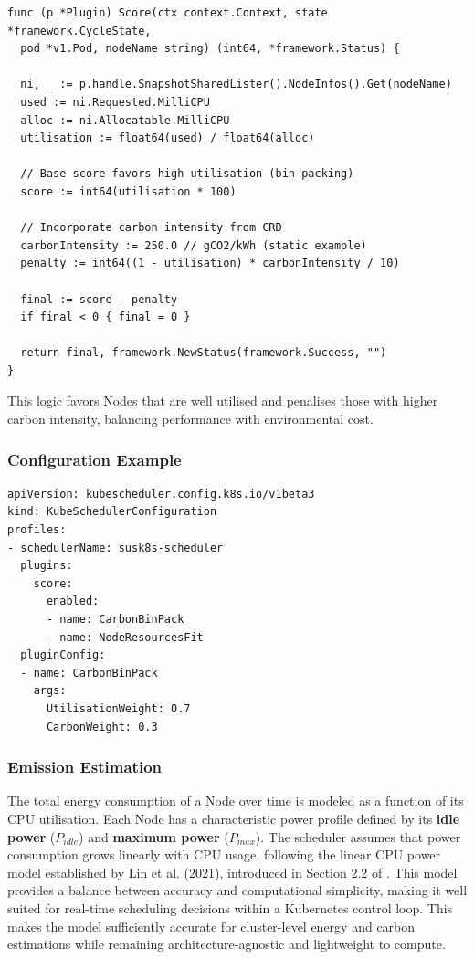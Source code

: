 \documentclass{article}
\begin{document}
\begin{verbatim}
func (p *Plugin) Score(ctx context.Context, state *framework.CycleState,
  pod *v1.Pod, nodeName string) (int64, *framework.Status) {

  ni, _ := p.handle.SnapshotSharedLister().NodeInfos().Get(nodeName)
  used := ni.Requested.MilliCPU
  alloc := ni.Allocatable.MilliCPU
  utilisation := float64(used) / float64(alloc)

  // Base score favors high utilisation (bin-packing)
  score := int64(utilisation * 100)

  // Incorporate carbon intensity from CRD
  carbonIntensity := 250.0 // gCO2/kWh (static example)
  penalty := int64((1 - utilisation) * carbonIntensity / 10)

  final := score - penalty
  if final < 0 { final = 0 }

  return final, framework.NewStatus(framework.Success, "")
}
\end{verbatim}

This logic favors Nodes that are well utilised and penalises those with higher carbon intensity, balancing performance with environmental cost.

\subsubsection{Configuration Example}

\begin{verbatim}
apiVersion: kubescheduler.config.k8s.io/v1beta3
kind: KubeSchedulerConfiguration
profiles:
- schedulerName: susk8s-scheduler
  plugins:
    score:
      enabled:
      - name: CarbonBinPack
      - name: NodeResourcesFit
  pluginConfig:
  - name: CarbonBinPack
    args:
      UtilisationWeight: 0.7
      CarbonWeight: 0.3
\end{verbatim}

\subsubsection{Emission Estimation}
The total energy consumption of a Node over time is modeled as a function of its CPU utilisation.  
Each Node has a characteristic power profile defined by its \textbf{idle power} ($P_{idle}$) and \textbf{maximum power} ($P_{max}$).  
The scheduler assumes that power consumption grows linearly with CPU usage, following the linear CPU power model established by Lin et al. (2021), introduced in Section 2.2 of \cite{Lin2021HCPM}.  
This model provides a balance between accuracy and computational simplicity, making it well suited for real-time scheduling decisions within a Kubernetes control loop. 
This makes the model sufficiently accurate for cluster-level energy and carbon estimations while remaining architecture-agnostic and lightweight to compute.
\end{document}
